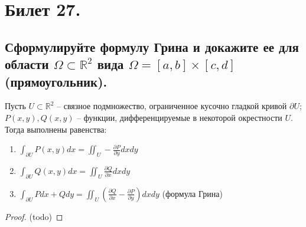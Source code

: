 \section{Билет 27.}

\subsection{Сформулируйте формулу Грина и докажите ее для области $\Omega \subset \mathbb{R}^2$ вида $\Omega = [a,b] \times [c, d]$ (прямоугольник).}
\begin{statement}
    Пусть $U \subset \mathbb{R}^2$ -- связное подмножество, ограниченное кусочно гладкой кривой $\partial U$; $P(x,y), Q(x,y)$ -- функции, дифференцируемые в некоторой окрестности $U$. Тогда выполнены равенства:
    \begin{enumerate}
        \item $\int_{\partial U} P(x,y) dx = \iint_U - \frac{\partial P}{\partial y} dx dy$
        \item $\int_{\partial U} Q(x,y) dx = \iint_U \frac{\partial Q}{\partial x} dx dy$
        \item $\int_{\partial U} P dx + Q dy = \iint_U \left(
            \frac{\partial Q}{\partial x} - \frac{\partial P}{\partial y}
        \right) dx dy$ (формула Грина)
    \end{enumerate}
    \begin{proof}
        (todo)
    \end{proof}
\end{statement}